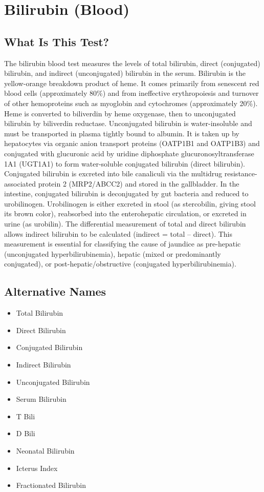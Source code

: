 \chapter{Bilirubin (Blood)}

\section*{What Is This Test?}
The bilirubin blood test measures the levels of total bilirubin, direct (conjugated) bilirubin, and indirect (unconjugated) bilirubin in the serum. Bilirubin is the yellow-orange breakdown product of heme. It comes primarily from senescent red blood cells (approximately 80\%) and from ineffective erythropoiesis and turnover of other hemoproteins such as myoglobin and cytochromes (approximately 20\%). Heme is converted to biliverdin by heme oxygenase, then to unconjugated bilirubin by biliverdin reductase. Unconjugated bilirubin is water-insoluble and must be transported in plasma tightly bound to albumin. It is taken up by hepatocytes via organic anion transport proteins (OATP1B1 and OATP1B3) and conjugated with glucuronic acid by uridine diphosphate glucuronosyltransferase 1A1 (UGT1A1) to form water-soluble conjugated bilirubin (direct bilirubin). Conjugated bilirubin is excreted into bile canaliculi via the multidrug resistance-associated protein 2 (MRP2/ABCC2) and stored in the gallbladder. In the intestine, conjugated bilirubin is deconjugated by gut bacteria and reduced to urobilinogen. Urobilinogen is either excreted in stool (as stercobilin, giving stool its brown color), reabsorbed into the enterohepatic circulation, or excreted in urine (as urobilin). The differential measurement of total and direct bilirubin allows indirect bilirubin to be calculated (indirect = total -- direct). This measurement is essential for classifying the cause of jaundice as pre-hepatic (unconjugated hyperbilirubinemia), hepatic (mixed or predominantly conjugated), or post-hepatic/obstructive (conjugated hyperbilirubinemia).

\section*{Alternative Names}
\begin{itemize}
  \item Total Bilirubin
  \item Direct Bilirubin
  \item Conjugated Bilirubin
  \item Indirect Bilirubin
  \item Unconjugated Bilirubin
  \item Serum Bilirubin
  \item T Bili
  \item D Bili
  \item Neonatal Bilirubin
  \item Icterus Index
  \item Fractionated Bilirubin
\end{itemize}
